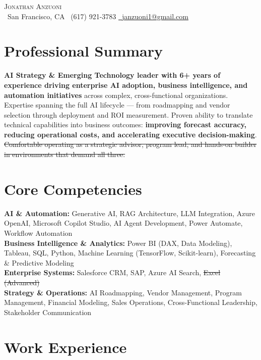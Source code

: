 \documentclass[letterpaper,11pt]{article}
\begin{document}
\begin{center}
    {\Huge\scshape Jonathan Anzuoni}\\
    \small
    \raisebox{-0.2\height}\faMapMarker*\ San Francisco, CA
    \quad
    \raisebox{-0.2\height}\faPhone\ (617) 921-3783
    \quad
    \href{mailto:janzuoni1@gmail.com}{
      \raisebox{-0.2\height}\faEnvelope\ \underline{janzuoni1@gmail.com}
    }
\end{center}

\section{Professional Summary}

\small{
\textbf{AI Strategy \& Emerging Technology leader with 6+ years of experience driving enterprise AI adoption, business intelligence, and automation initiatives} across complex, cross-functional organizations. Expertise spanning the full AI lifecycle --- from roadmapping and vendor selection through deployment and ROI measurement. Proven ability to translate technical capabilities into business outcomes: \textbf{improving forecast accuracy, reducing operational costs, and accelerating executive decision-making}. \sout{Comfortable operating as a strategic advisor, program lead, and hands-on builder in environments that demand all three.}
}

\section{Core Competencies}

\small{
\textbf{AI \& Automation:} Generative AI, RAG Architecture, LLM Integration, Azure OpenAI, Microsoft Copilot Studio, AI Agent Development, Power Automate, Workflow Automation\\
\textbf{Business Intelligence \& Analytics:} Power BI (DAX, Data Modeling), Tableau, SQL, Python, Machine Learning (TensorFlow, Scikit-learn), Forecasting \& Predictive Modeling\\
\textbf{Enterprise Systems:} Salesforce CRM, SAP, Azure AI Search, \sout{Excel (Advanced)}\\
\textbf{Strategy \& Operations:} AI Roadmapping, Vendor Management, Program Management, Financial Modeling, Sales Operations, Cross-Functional Leadership, Stakeholder Communication
}

\section{Work Experience}
\end{document}
